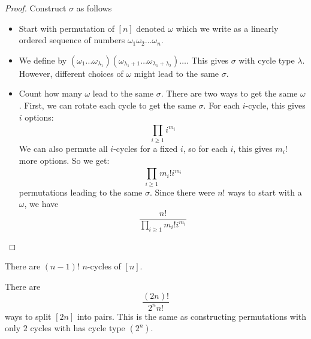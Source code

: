\documentclass{report}
\begin{document}
\begin{proof}
    Construct $\sigma$ as follows
        \begin{itemize}
            \item Start with permutation of $[n]$ denoted $\omega$ which we write as a linearly ordered sequence of numbers $\omega_{1}\omega_{2}\ldots \omega_{n}$.

            \item We define by $(\omega_{1}\ldots \omega_{\lambda_{1}})(\omega_{\lambda_{1} + 1}\ldots \omega_{\lambda_{1} + \lambda_{2}}) \ldots $. This gives $\sigma$ with cycle type $\lambda$. However, different choices of $\omega$ might lead to the same $\sigma.$

            \item Count how many $\omega$ lead to the same $\sigma$. There are two ways to get the same $\omega$. First, we can rotate each cycle to get the same $\sigma$. For each $i$-cycle, this gives $i$ options:
                \begin{equation*}
                    \prod_{i \geq 1}^{} i^{m_{i}}
                \end{equation*}
            We can also permute all $i$-cycles for a fixed $i$, so for each $i$, this gives $m_{i}!$ more options. So we get:
                \begin{equation*}
                    \prod_{i \geq 1}^{} m_{i}!i^{m_{i}}
                \end{equation*}
            permutations leading to the same $\sigma$. Since there were $n!$ ways to start with a $\omega$, we have
                \begin{equation*}
                    \dfrac{n!}{\prod_{i \geq 1}^{} m_{i}!i^{m_{i}}}
                \end{equation*}
        \end{itemize}
\end{proof}

\begin{examples}
    \begin{example}
        There are $(n - 1)!$ $n$-cycles of $[n]$.
    \end{example}
    \begin{example}
        There are
            \begin{equation*}
                \dfrac{(2n)!}{2^{n}n!}
            \end{equation*}
        ways to split $[2n]$ into pairs. This is the same as constructing permutations with only $2$ cycles with has cycle type $(2^{n})$.
    \end{example}
\end{examples}
\end{document}
